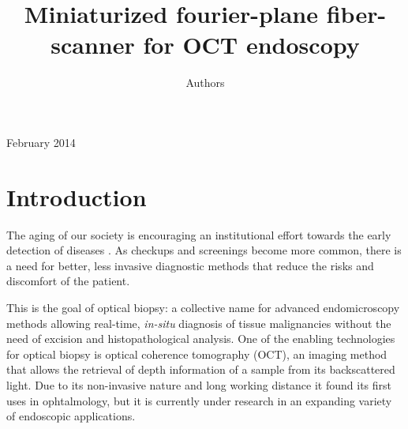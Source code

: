 \documentclass[10pt]{iopart}
\begin{document}
\title[Miniaturized fourier-plane fiber-scanner for OCT endoscopy]{Miniaturized fourier-plane fiber-scanner for OCT endoscopy}

\author{Authors}

\address{Address}
\vspace{10pt}
\begin{indented}
\item[]February 2014
\end{indented}

\begin{abstract}


\end{abstract}
%
%
%
% 
\ioptwocol
%

\section{Introduction}
The aging of our society is encouraging an institutional effort towards the early detection of diseases \cite{Fendrich2007}. As checkups and screenings become more common, there is a need for better, less invasive diagnostic methods that reduce the risks and discomfort of the patient. 

This is the goal of optical biopsy: a collective name for advanced endomicroscopy methods allowing real-time, \textit{in-situ} diagnosis of tissue malignancies without the need of excision and histopathological analysis. One of the enabling technologies for optical biopsy is optical coherence tomography (OCT), an imaging method that allows the retrieval of depth information of a sample from its backscattered light.  Due to its non-invasive nature and long working distance it found its first uses in ophtalmology, but it is currently under research in an expanding variety of endoscopic applications. 
\end{document}
